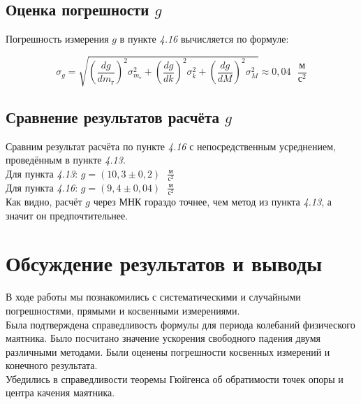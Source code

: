 \documentclass[a4paper,12pt]{article}
\begin{document}
\subsection{Оценка погрешности $g$}

Погрешность измерения $g$ в пункте \textit{4.16} вычисляется по формуле:

\begin{equation}
    \sigma_{g} = \sqrt{
    \left( \frac{d g}{d m_\text{г}}  \right) ^ 2 \sigma_{m_\text{г}} ^ 2 + 
    \left( \frac{d g}{d k}  \right) ^ 2 \sigma_{k} ^ 2 + 
    \left( \frac{d g}{d M}  \right) ^ 2 \sigma_{M} ^ 2
    } \approx 0,04 \text{ } \frac{\text{м}}{\text{с}^2}
\end{equation}

\subsection{Сравнение результатов расчёта $g$}

Сравним результат расчёта по пункте \textit{4.16} с непосредственным усреднением, проведённым в пункте \textit{4.13}.\\

Для пункта \textit{4.13}: $g = (10,3 \pm 0,2) \text{ } \frac{\text{м}}{\text{с}^2}$ \\

Для пункта \textit{4.16}: $g = (9,4 \pm 0,04) \text{ } \frac{\text{м}}{\text{с}^2}$ \\

Как видно, расчёт $g$ через МНК гораздо точнее, чем метод из пункта \textit{4.13}, а значит он предпочтительнее.


\section{Обсуждение результатов и выводы}

В ходе работы мы познакомились с систематическими и случайными погрешностями, прямыми и косвенными измерениями. \\

Была подтверждена справедливость формулы для периода колебаний физического маятника. Было посчитано значение ускорения свободного падения двумя различными методами. Были оценены погрешности косвенных измерений и конечного результата.\\

Убедились в справедливости теоремы Гюйгенса об обратимости точек опоры и центра качения маятника.\\
\end{document}

